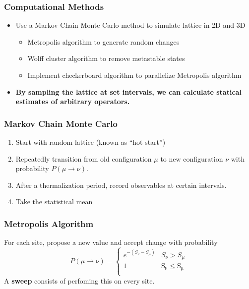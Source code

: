 \documentclass{beamer}
\begin{document}
\begin{frame}
    \frametitle{Computational Methods}
\begin{itemize}
    \item Use a Markov Chain Monte Carlo method to simulate lattice in 2D and 3D
        \begin{itemize}
            \item Metropolis algorithm to generate random changes
            \item Wolff cluster algorithm to remove metastable states
            \item Implement checkerboard algorithm to parallelize Metropolis algorithm
        \end{itemize}

    \item \textbf{By sampling the lattice at set intervals, we can calculate statical estimates of arbitrary operators.}
\end{itemize}

\end{frame}

\begin{frame}
    \frametitle{Markov Chain Monte Carlo}
\begin{enumerate}
    \item Start with random lattice (known as ``hot start'')
    \item Repeatedly transition from old configuration $\mu$ to new configuration $\nu$ with probability $P(\mu\rightarrow\nu)$.
    \item After a thermalization period, record observables at certain intervals. 
    \item Take the statistical mean
\end{enumerate}
\end{frame}

\begin{frame}
    \frametitle{Metropolis Algorithm}
    For each site, propose a new value and accept change with probability
        \begin{equation*}
    P(\mu\rightarrow\nu) = \begin{cases} 
        e^{-(S_\nu - S_\mu)} & S_\nu > S_\mu \\
        1 & \mathrm{S_\nu \leq S_\mu} \\
       \end{cases}
        \end{equation*} 
        A \textbf{sweep} consists of perfoming this on every site.

\end{frame}
\end{document}
